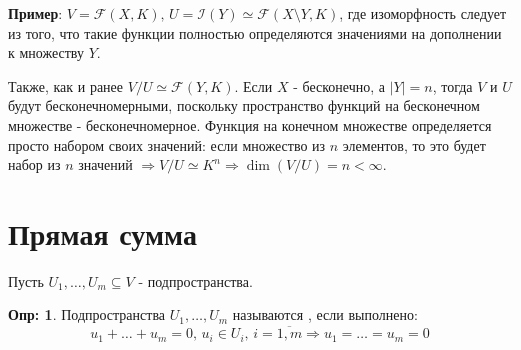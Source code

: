 \documentclass[12pt]{article}
\newcommand{\MCI}{\mathcal{I}}
\newcommand{\MF}{\mathcal{F}}
\theoremstyle{definition}
\newtheorem{defn}{Опр:}
\begin{document}
\textbf{Пример}: $V = \MF(X,K), \, U = \MCI (Y) \simeq \MF(X\setminus Y,K)$, где изоморфность следует из того, что такие функции полностью определяются значениями на дополнении к множеству $Y$.

Также, как и ранее $V/U \simeq \MF(Y,K)$. Если $X$ - бесконечно, а $|Y| = n$, тогда $V$ и $U$ будут бесконечномерными, поскольку пространство функций на бесконечном множестве - бесконечномерное. Функция на конечном множестве определяется просто набором своих значений: если множество из $n$ элементов, то это будет набор из $n$ значений $\Rightarrow V / U \simeq K^n \Rightarrow \dim{(V/U)} = n < \infty$.

\newpage
\section*{Прямая сумма}
Пусть $U_1, \dotsc, U_m \subseteq V$ - подпространства.
\begin{defn}
	Подпространства $U_1, \dotsc, U_m$ называются , если выполнено:
	$$
		u_1 + \dotsc + u_m = 0, \, u_i \in U_i, \, i =\overline{1,m} \Rightarrow u_1 = \dotsc = u_m = 0
	$$
\end{defn}
\end{document}
